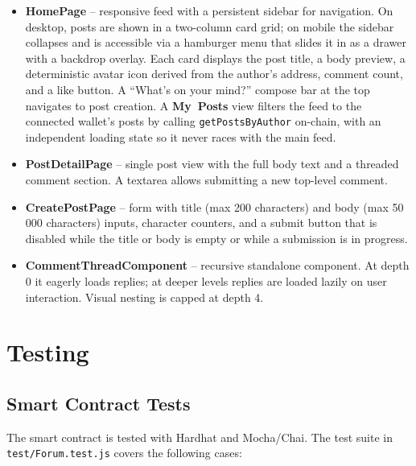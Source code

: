 \documentclass[11pt]{article}
\begin{document}
\begin{itemize}
  \item \textbf{HomePage} -- responsive feed with a persistent sidebar for navigation. On desktop, posts are shown in a two-column card grid; on mobile the sidebar collapses and is accessible via a hamburger menu that slides it in as a drawer with a backdrop overlay. Each card displays the post title, a body preview, a deterministic avatar icon derived from the author's address, comment count, and a like button. A ``What's on your mind?'' compose bar at the top navigates to post creation. A \textbf{My~Posts} view filters the feed to the connected wallet's posts by calling \texttt{getPostsByAuthor} on-chain, with an independent loading state so it never races with the main feed.
  \item \textbf{PostDetailPage} – single post view with the full body text and a threaded comment section. A textarea allows submitting a new top-level comment.
  \item \textbf{CreatePostPage} – form with title (max 200 characters) and body (max 50\,000 characters) inputs, character counters, and a submit button that is disabled while the title or body is empty or while a submission is in progress.
  \item \textbf{CommentThreadComponent} – recursive standalone component. At depth 0 it eagerly loads replies; at deeper levels replies are loaded lazily on user interaction. Visual nesting is capped at depth 4.
\end{itemize}

\section{Testing}
\label{sec:testing}

\subsection{Smart Contract Tests}

The smart contract is tested with Hardhat and Mocha/Chai. The test suite in \texttt{test/Forum.test.js} covers the following cases:
\end{document}
